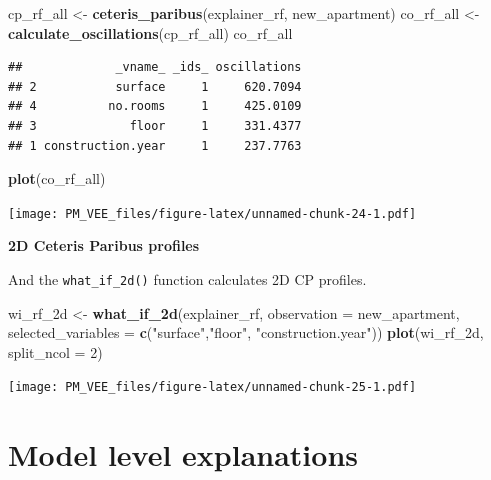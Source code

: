 \documentclass[]{book}
\newenvironment{Shaded}{\begin{snugshade}}{\end{snugshade}}
\newcommand{\DataTypeTok}[1]{\textcolor[rgb]{0.13,0.29,0.53}{#1}}
\newcommand{\DecValTok}[1]{\textcolor[rgb]{0.00,0.00,0.81}{#1}}
\newcommand{\KeywordTok}[1]{\textcolor[rgb]{0.13,0.29,0.53}{\textbf{#1}}}
\newcommand{\NormalTok}[1]{#1}
\newcommand{\StringTok}[1]{\textcolor[rgb]{0.31,0.60,0.02}{#1}}
\theoremstyle{definition}
\theoremstyle{definition}
\theoremstyle{definition}
\theoremstyle{remark}
\begin{document}
\begin{Shaded}
\begin{Highlighting}[]
\NormalTok{cp_rf_all <-}\StringTok{ }\KeywordTok{ceteris_paribus}\NormalTok{(explainer_rf, new_apartment)}
\NormalTok{co_rf_all <-}\StringTok{ }\KeywordTok{calculate_oscillations}\NormalTok{(cp_rf_all)}
\NormalTok{co_rf_all}
\end{Highlighting}
\end{Shaded}

\begin{verbatim}
##             _vname_ _ids_ oscillations
## 2           surface     1     620.7094
## 4          no.rooms     1     425.0109
## 3             floor     1     331.4377
## 1 construction.year     1     237.7763
\end{verbatim}

\begin{Shaded}
\begin{Highlighting}[]
\KeywordTok{plot}\NormalTok{(co_rf_all)}
\end{Highlighting}
\end{Shaded}

\texttt{[image: PM\_VEE\_files/figure-latex/unnamed-chunk-24-1.pdf]}

\textbf{2D Ceteris Paribus profiles}

And the \texttt{what\_if\_2d()} function calculates 2D CP profiles.

\begin{Shaded}
\begin{Highlighting}[]
\NormalTok{wi_rf_2d <-}\StringTok{ }\KeywordTok{what_if_2d}\NormalTok{(explainer_rf, }\DataTypeTok{observation =}\NormalTok{ new_apartment, }
                 \DataTypeTok{selected_variables =} \KeywordTok{c}\NormalTok{(}\StringTok{"surface"}\NormalTok{,}\StringTok{"floor"}\NormalTok{, }\StringTok{"construction.year"}\NormalTok{))}
\KeywordTok{plot}\NormalTok{(wi_rf_2d, }\DataTypeTok{split_ncol =} \DecValTok{2}\NormalTok{)}
\end{Highlighting}
\end{Shaded}

\texttt{[image: PM\_VEE\_files/figure-latex/unnamed-chunk-25-1.pdf]}

\hypertarget{model-level-explanations}{%
\chapter*{Model level explanations}\label{model-level-explanations}}
\end{document}
